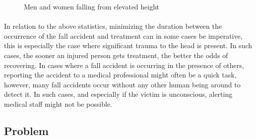 \documentclass[12pt, a4paper, onecolumn]{article}
\begin{document}
		\begin{figure}[H]
			\centering
			\qquad
			\caption{Men and women falling from elevated height}%
			\label{fig:example}%
		\end{figure}
	
			\paragraph{} In relation to the above statistics, minimizing the duration between the occurrence of the fall accident and treatment can in some cases be imperative, this is especially the case where significant trauma to the head is present. In such cases, the sooner an injured person gets treatment, the better the odds of recovering. In cases where a fall accident is occurring in the presence of others, reporting the accident to a medical professional might often be a quick task, however, many fall accidents occur without any other human being around to detect it. In such cases, and especially if the victim is unconscious, alerting medical staff might not be possible. 
		
		
		\subsection{Problem}
		
\end{document}
